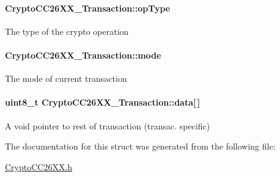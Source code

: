 \paragraph[{op\+Type}]{ Crypto\+C\+C26\+X\+X\+\_\+\+Transaction\+::op\+Type}\label{struct_crypto_c_c26_x_x___transaction_a40fe1424c6534f76622ff56ed4f2ab42}
The type of the crypto operation 
\paragraph[{mode}]{ Crypto\+C\+C26\+X\+X\+\_\+\+Transaction\+::mode}\label{struct_crypto_c_c26_x_x___transaction_afe088678af719e3dc46c3196334b9398}
The mode of current transaction 
\paragraph[{data}]{\setlength{\rightskip}{0pt plus 5cm}uint8\+\_\+t Crypto\+C\+C26\+X\+X\+\_\+\+Transaction\+::data\mbox{[}$\,$\mbox{]}}\label{struct_crypto_c_c26_x_x___transaction_a3eb99656cb17d1c68fc28d42b5b392dd}
A void pointer to rest of transaction (transac. specific) 

The documentation for this struct was generated from the following file\+:\begin{DoxyCompactItemize}
\item 
\hyperlink{_crypto_c_c26_x_x_8h}{Crypto\+C\+C26\+X\+X.\+h}\end{DoxyCompactItemize}
